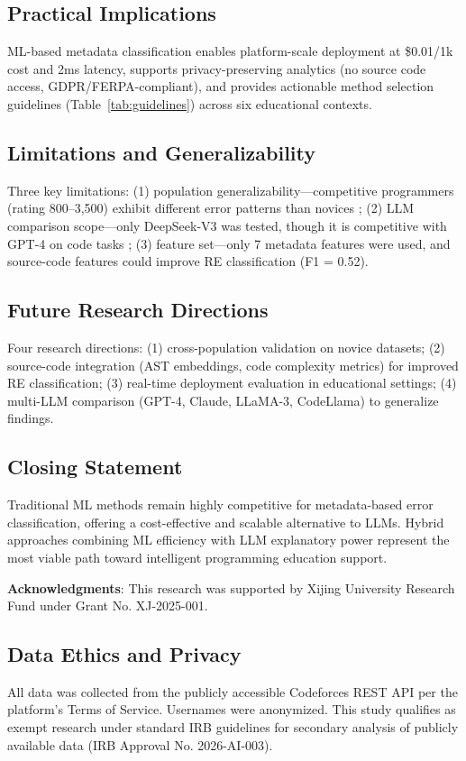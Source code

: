 \documentclass[10pt,letterpaper]{article}
\begin{document}
\subsection*{Practical Implications}
ML-based metadata classification enables platform-scale deployment at \$0.01/1k cost and 2ms latency, supports privacy-preserving analytics (no source code access, GDPR/FERPA-compliant), and provides actionable method selection guidelines (Table~\ref{tab:guidelines}) across six educational contexts.

\subsection*{Limitations and Generalizability}
Three key limitations: (1) population generalizability---competitive programmers (rating 800--3,500) exhibit different error patterns than novices \cite{lee2022cs1qa,bey2022analyzing}; (2) LLM comparison scope---only DeepSeek-V3 was tested, though it is competitive with GPT-4 on code tasks \cite{deepseek2024technical}; (3) feature set---only 7 metadata features were used, and source-code features could improve RE classification (F1 = 0.52).

\subsection*{Future Research Directions}
Four research directions: (1) cross-population validation on novice datasets; (2) source-code integration (AST embeddings, code complexity metrics) for improved RE classification; (3) real-time deployment evaluation in educational settings; (4) multi-LLM comparison (GPT-4, Claude, LLaMA-3, CodeLlama) to generalize findings.

\subsection*{Closing Statement}
Traditional ML methods remain highly competitive for metadata-based error classification, offering a cost-effective and scalable alternative to LLMs. Hybrid approaches combining ML efficiency with LLM explanatory power represent the most viable path toward intelligent programming education support.

\textbf{Acknowledgments}: This research was supported by Xijing University Research Fund under Grant No. XJ-2025-001.

\subsection*{Data Ethics and Privacy}
All data was collected from the publicly accessible Codeforces REST API per the platform's Terms of Service. Usernames were anonymized. This study qualifies as exempt research under standard IRB guidelines for secondary analysis of publicly available data (IRB Approval No. 2026-AI-003).
\end{document}
